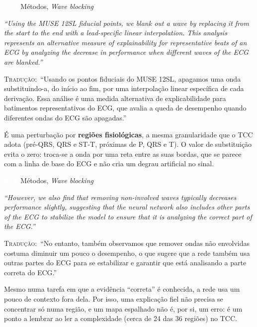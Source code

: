 \documentclass[11pt,a4paper]{article}
\newcommand{\pagechip}[1]{{\setlength{\fboxsep}{1.5pt}\colorbox{cAcc}{\textcolor{white}{\scriptsize\texttt{#1}}}}}
\newenvironment{origquote}{\par\itshape\small}{\par}
\newenvironment{tradquote}{\par\small\textsc{Tradução:}\ }{\par}
\newcommand{\explab}[1]{\par\smallskip{\small\color{cAcc}\textbf{\MakeUppercase{#1}}}\par}
\begin{document}
\begin{citacard}{\pagechip{p. 9} Métodos, \textit{Wave blocking}}
\begin{origquote}“Using the MUSE 12SL fiducial points, we blank out a wave by replacing it from the start to the end with a lead-specific linear interpolation. This analysis represents an alternative measure of explainability for representative beats of an ECG by analyzing the decrease in performance when different waves of the ECG are blanked.”\end{origquote}
\begin{tradquote}“Usando os pontos fiduciais do MUSE 12SL, apagamos uma onda substituindo-a, do início ao fim, por uma interpolação linear específica de cada derivação. Essa análise é uma medida alternativa de explicabilidade para batimentos representativos do ECG, que avalia a queda de desempenho quando diferentes ondas do ECG são apagadas.”\end{tradquote}
\explab{Explicação}
É uma perturbação por \textbf{regiões fisiológicas}, a mesma granularidade que o TCC adota (pré-QRS, QRS e ST-T, próximas de P, QRS e T). O valor de substituição evita o zero: troca-se a onda por uma reta entre as suas bordas, que se parece com a linha de base do ECG e não cria um degrau artificial no sinal.
\end{citacard}

\begin{citacard}{\pagechip{p. 9} Métodos, \textit{Wave blocking}}
\begin{origquote}“However, we also find that removing non-involved waves typically decreases performance slightly, suggesting that the neural network also includes other parts of the ECG to stabilize the model to ensure that it is analyzing the correct part of the ECG.”\end{origquote}
\begin{tradquote}“No entanto, também observamos que remover ondas não envolvidas costuma diminuir um pouco o desempenho, o que sugere que a rede também usa outras partes do ECG para se estabilizar e garantir que está analisando a parte correta do ECG.”\end{tradquote}
\explab{Explicação}
Mesmo numa tarefa em que a evidência “correta” é conhecida, a rede usa um pouco de contexto fora dela. Por isso, uma explicação fiel não precisa se concentrar só numa região, e um mapa espalhado não é, por si, um erro: é um ponto a lembrar ao ler a complexidade (cerca de 24 das 36 regiões) no TCC.
\end{citacard}
\end{document}

